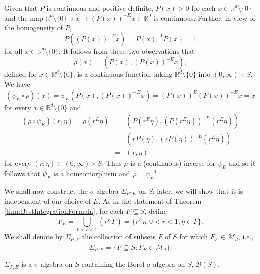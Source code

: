 \documentclass[smallextended]{svjour3}
\theoremstyle{remark}
\renewenvironment{proof}[1][\proofname]{\renewcommand\xproofname{#1}\xproof}{\endxproof}
\begin{document}
\begin{proof}
Given that $P$ is continuous and positive definite, $P(x)>0$ for each $x\in \mathbb{R}^d\setminus\{0\}$ and the map $\mathbb{R}^d\setminus\{0\}\ni x \mapsto (P(x))^{-E}x\in \mathbb{R}^d$ is continuous. Further, in view of the homogeneity of $P$,
\begin{equation*}
P\left((P(x))^{-E} x \right)=P(x)^{-1}P(x)=1
\end{equation*}
for all $x\in\mathbb{R}^d\setminus\{0\}$. It follows from these two observations that
\begin{equation*}
\rho(x)=(P(x),(P(x))^{-E}x),
\end{equation*}
defined for $x\in\mathbb{R}^d\setminus\{0\}$, is a continuous function taking $\mathbb{R}^d\setminus\{0\}$ into $(0,\infty)\times S$. We have
\begin{equation*}
(\psi_E\circ \rho)(x)=\psi_E(P(x),(P(x))^{-E}x)=(P(x))^{E}(P(x))^{-E}x=x
\end{equation*}
for every $x\in \mathbb{R}^d\setminus \{0\}$ and
\begin{eqnarray*}
(\rho\circ\psi_E)(r,\eta)=\rho(r^E\eta)&=&(P(r^{E}\eta),(P(r^{E}\eta))^{-E}(r^E\eta))\\
&=&(rP(\eta),(rP(\eta))^{-E}(r^{E}\eta))\\
&=&(r,\eta)
\end{eqnarray*}
for every $(r,\eta)\in (0,\infty)\times S$. Thus $\rho$ is a (continuous) inverse for $\psi_E$ and so it follows that $\psi_E$ is a homeomorphism and $\rho=\psi_E^{-1}$.
\end{proof}



\noindent We shall now construct the $\sigma$-algebra $\Sigma_{P,E}$ on $S$; later, we will show that it is independent of our choice of $E$. As in the statement of Theorem \ref{thm:BestIntegrationFormula}, for each $F\subseteq S$, define
\begin{equation*}
\widetilde{F_E}=\bigcup_{0<r<1}\left(r^E F\right)=\{r^E\eta:0<r<1,\eta\in F\}. 
\end{equation*}
We shall denote by $\Sigma_{P,E}$ the collection of subsets $F$ of $S$ for which $\widetilde{F_E}\in\mathcal{M}_d$, i.e.,  
\begin{equation*}
\Sigma_{P,E}=\{F\subseteq S:\widetilde{F_E}\in\mathcal{M}_d\}.
\end{equation*}


\begin{proposition}\label{prop:BorelContainment}
$\Sigma_{P,E}$ is a $\sigma$-algebra on $S$ containing the Borel $\sigma$-algebra on $S$, $\mathcal{B}(S)$.
\end{proposition}
\end{document}
